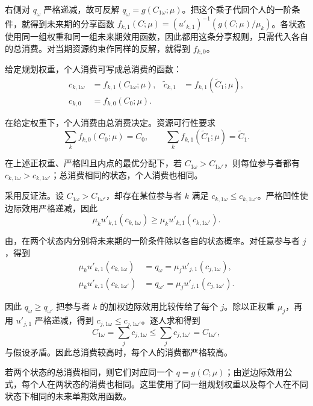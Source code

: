 右侧对 $q_\omega$ 严格递减，故可反解 $q_\omega=g(C_{1\omega};\mu)$。把这个乘子代回个人的一阶条件，就得到未来期的分享函数 $f_{k,1}(C;\mu)=(u'_{k,1})^{-1}(g(C;\mu)/\mu_k)$。各状态使用同一组权重和同一组未来期效用函数，因此都用这条分享规则，只需代入各自的总消费。对当期资源约束作同样的反解，就得到 $f_{k,0}$。

\begin{tcolorbox}[knowledge,title=最优分享规则]
给定规划权重，个人消费可写成总消费的函数：
\begin{equation}
 \begin{aligned}
 c_{k,1\omega}&=f_{k,1}(C_{1\omega};\mu),
 &\widetilde c_{k,1}&=f_{k,1}(\widetilde C_1;\mu),\\
 c_{k,0}&=f_{k,0}(C_0;\mu).
 \end{aligned}
 \label{eq:wj-10-10}
\end{equation}

在给定权重下，个人消费由总消费决定。资源可行性要求
\begin{equation}
 \sum_k f_{k,0}(C_0;\mu)=C_0,\qquad
 \sum_k f_{k,1}(\widetilde C_1;\mu)=\widetilde C_1.
 \label{eq:wj-10-11}
\end{equation}
\end{tcolorbox}

\begin{tcolorbox}[knowledge]
 在上述正权重、严格凹且内点的最优分配下，若 $C_{1\omega}>C_{1\omega'}$，则每位参与者都有 $c_{k,1\omega}>c_{k,1\omega'}$；总消费相同的状态，个人消费也相同。
\end{tcolorbox}

\begin{solution}[label-content={证明},blank-type=none]
采用反证法。设 $C_{1\omega}>C_{1\omega'}$，却存在某位参与者 $k$ 满足 $c_{k,1\omega}\le c_{k,1\omega'}$。严格凹性使边际效用严格递减，因此
\[
 \mu_k u'_{k,1}(c_{k,1\omega})
 \ge \mu_k u'_{k,1}(c_{k,1\omega'}).
\]

由，在两个状态内分别将未来期的一阶条件除以各自的状态概率。对任意参与者 $j$，得到
\[
 \begin{aligned}
 \mu_k u'_{k,1}(c_{k,1\omega}) &= q_\omega
     =\mu_j u'_{j,1}(c_{j,1\omega}),\\
 \mu_k u'_{k,1}(c_{k,1\omega'}) &= q_{\omega'}
     =\mu_j u'_{j,1}(c_{j,1\omega'}).
 \end{aligned}
\]

因此 $q_\omega\ge q_{\omega'}$ 把参与者 $k$ 的加权边际效用比较传给了每个 $j$。除以正权重 $\mu_j$，再用 $u'_{j,1}$ 严格递减，得到 $c_{j,1\omega}\le c_{j,1\omega'}$。逐人求和得到
\[
 C_{1\omega}=\sum_j c_{j,1\omega}
 \le \sum_j c_{j,1\omega'}=C_{1\omega'},
\]
与假设矛盾。因此总消费较高时，每个人的消费都严格较高。

若两个状态的总消费相同，则它们对应同一个 $q=g(C;\mu)$；由逆边际效用公式，每个人在两状态的消费也相同。这里使用了同一组规划权重以及每个人在不同状态下相同的未来单期效用函数。
\end{solution}

